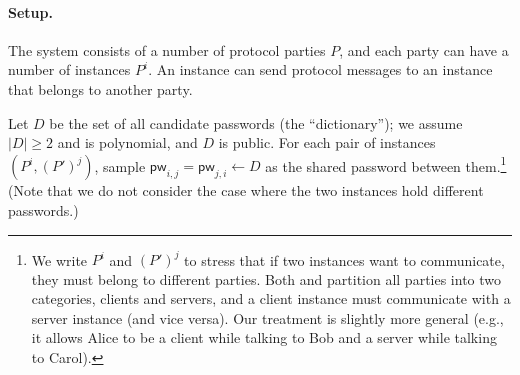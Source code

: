 \documentclass{article}
\newcommand{\pw}{\mathsf{pw}}
\begin{document}
\paragraph{Setup.}
The system consists of a number of protocol parties $P$, and each party can have a number of instances $P^i$. An instance can send protocol messages to an instance that belongs to another party.

Let $D$ be the set of all candidate passwords (the ``dictionary''); we assume $|D| \geq 2$ and is polynomial, and $D$ is public. For each pair of instances $(P^i, (P')^j)$, sample $\pw_{i,j} = \pw_{j,i} \gets D$ as the shared password between them.\footnote{We write $P^i$ and $(P')^j$ to stress that if two instances want to communicate, they must belong to different parties. Both \cite{EC:BelPoiRog00} and \cite{JACM:KatOstYun09} partition all parties into two categories, clients and servers, and a client instance must communicate with a server instance (and vice versa). Our treatment is slightly more general (e.g., it allows Alice to be a client while talking to Bob and a server while talking to Carol).} (Note that we do not consider the case where the two instances hold different passwords.)
\end{document}
